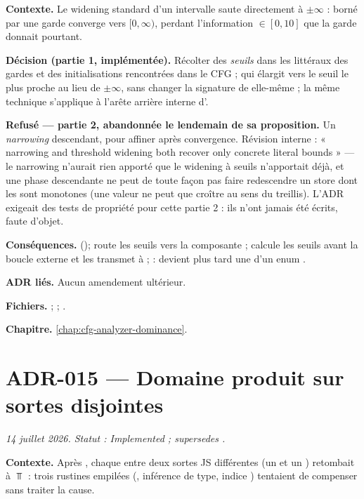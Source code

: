 \textbf{Contexte.} Le widening standard d'un intervalle saute directement à
$\pm\infty$ :  borné par une garde  converge vers
$[0, \infty)$, perdant l'information  $\in [0, 10]$ que la garde
donnait pourtant.

\textbf{Décision (partie 1, implémentée).} Récolter des \emph{seuils} dans les
littéraux des gardes et des initialisations rencontrées dans le CFG ;
 qui élargit vers le seuil le plus
proche au lieu de $\pm\infty$, sans changer la signature de 
elle-même ; la même technique s'applique à l'arête arrière interne
d'.

\textbf{Refusé --- partie 2, abandonnée le lendemain de sa proposition.} Un
\emph{narrowing} descendant, pour affiner après convergence. Révision
interne : « narrowing and threshold widening both recover only concrete
literal bounds » --- le narrowing n'aurait rien apporté que le widening à
seuils n'apportait déjà, et une phase descendante ne peut de toute façon pas
faire redescendre un store dont les  sont monotones (une valeur ne
peut que croître au sens du treillis). L'ADR exigeait des tests de propriété
pour cette partie 2 : ils n'ont jamais été écrits, faute d'objet.

\textbf{Conséquences.}  ();
 route les seuils vers la composante
 ;  calcule les seuils avant la boucle
externe et les transmet à  ;  :
 devient plus tard une  d'un enum
.

\textbf{ADR liés.} Aucun amendement ultérieur.

\textbf{Fichiers.}  ;  ;
.

\textbf{Chapitre.} \cref{chap:cfg-analyzer-dominance}.

\section{ADR-015 --- Domaine produit sur sortes disjointes}
\label{adr:15}
\noindent\textit{14 juillet 2026. Statut : Implemented ; supersedes .}

\textbf{Contexte.} Après , chaque  entre deux sortes JS
différentes (un  et un ) retombait à $\Top$ : trois
rustines empilées (, inférence de type, indice
) tentaient de compenser sans traiter la cause.

